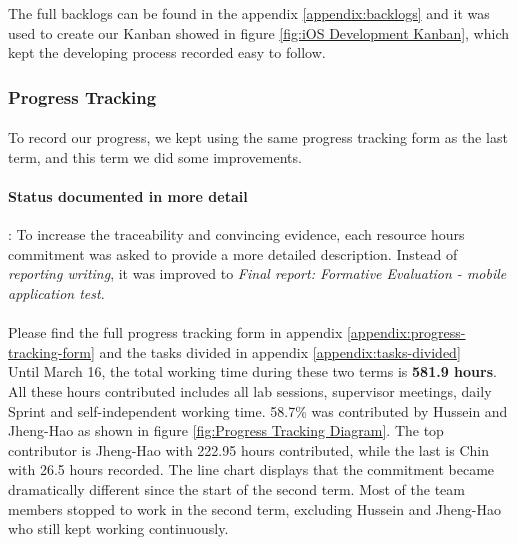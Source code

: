 \documentclass[12pt,a4paper]{article}
\begin{document}
          The full backlogs can be found in the appendix \ref{appendix:backlogs} and it was used to create our Kanban showed in figure \ref{fig:iOS Development Kanban}, which kept the developing process recorded easy to follow.        
          
        \subsubsection{Progress Tracking}
          \paragraph{}To record our progress, we kept using the same progress tracking form as the last term, and this term we did some improvements.  

          \paragraph{Status documented in more detail}: To increase the traceability and convincing evidence, each resource hours commitment was asked to provide a more detailed description. Instead of {\it reporting writing}, it was improved to {\it Final report: Formative Evaluation - mobile application test}.

          \paragraph{} Please find the full progress tracking form in appendix \ref{appendix:progress-tracking-form} and the tasks divided in appendix \ref{appendix:tasks-divided}\\
          
          Until March 16, the total working time during these two terms is {\bf 581.9 hours}. All these hours contributed includes all lab sessions, supervisor meetings, daily Sprint and self-independent working time. 58.7\% was contributed by Hussein and Jheng-Hao as shown in figure \ref{fig:Progress Tracking Diagram}. The top contributor is Jheng-Hao with 222.95 hours contributed, while the last is Chin with 26.5 hours recorded. The line chart displays that the commitment became dramatically different since the start of the second term. Most of the team members stopped to work in the second term, excluding Hussein and Jheng-Hao who still kept working continuously.
          
\end{document}
